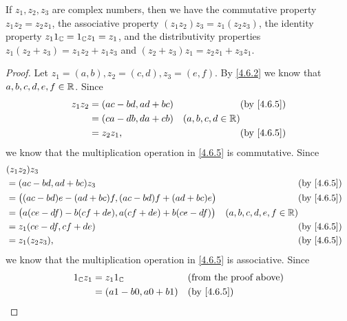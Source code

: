 \begin{lem}\label{4.6.6}
  If \(z_1, z_2, z_3\) are complex numbers, then we have the commutative property \(z_1 z_2 = z_2 z_1\), the associative property \((z_1 z_2) z_3 = z_1 (z_2 z_3)\), the identity property \(z_1 1_{\mathbb{C}} = 1_{\mathbb{C}} z_1 = z_1\), and the distributivity properties \(z_1 (z_2 + z_3) = z_1 z_2 + z_1 z_3\) and \((z_2 + z_3) z_1 = z_2 z_1 + z_3 z_1\).
\end{lem}

\begin{proof}
  Let \(z_1 = (a, b), z_2 = (c, d), z_3 = (e, f)\).
  By \cref{4.6.2} we know that \(a, b, c, d, e, f \in \mathbb{R}\).
  Since
  \begin{align*}
    z_1 z_2 & = (ac - bd, ad + bc) &                     & \text{(by \cref{4.6.5})} \\
            & = (ca - db, da + cb) & (a, b, c, d \in \R)                            \\
            & = z_2 z_1,           &                     & \text{(by \cref{4.6.5})}
  \end{align*}
  we know that the multiplication operation in \cref{4.6.5} is commutative.
  Since
  \begin{align*}
     & (z_1 z_2) z_3                                                                                                           \\
     & = (ac - bd, ad + bc) z_3                                         &                           & \text{(by \cref{4.6.5})} \\
     & = \big((ac - bd) e - (ad + bc) f, (ac - bd) f + (ad + bc) e\big) &                           & \text{(by \cref{4.6.5})} \\
     & = \big(a (ce - df) - b (cf + de), a (cf + de) + b (ce - df)\big) & (a, b, c, d, e, f \in \R)                            \\
     & = z_1 (ce - df, cf + de)                                         &                           & \text{(by \cref{4.6.5})} \\
     & = z_1 (z_2 z_3),                                                 &                           & \text{(by \cref{4.6.5})}
  \end{align*}
  we know that the multiplication operation in \cref{4.6.5} is associative.
  Since
  \begin{align*}
    1_{\C} z_1 & = z_1 1_{\C}             &                  & \text{(from the proof above)} \\
               & = (a 1 - b 0, a 0 + b 1) &                  & \text{(by \cref{4.6.5})}      \\

\end{align*}
\end{proof}
